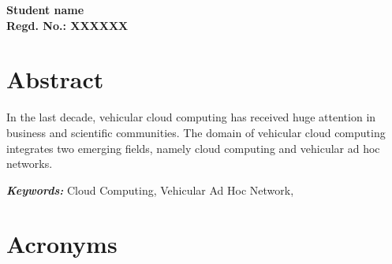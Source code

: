 \flushright
\textbf{Student name \\ Regd. No.: XXXXXX}
%
\clearpage
{}
\chapter*{Abstract}
\begin{center}

\end{center}

\flushleft 
\justify
In the last decade, vehicular cloud computing has received huge attention in business and scientific communities. The domain of vehicular cloud computing integrates two emerging fields, namely cloud computing and vehicular ad hoc networks. 
 
\textit{\textbf{Keywords:}} Cloud Computing, Vehicular Ad Hoc Network, 

  
\clearpage
\chapter*{Acronyms}

\clearpage
